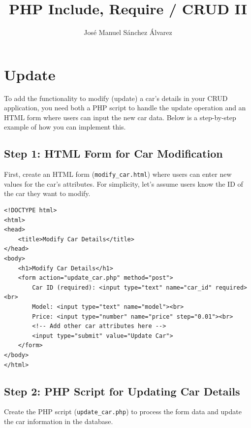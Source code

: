 \documentclass[11pt]{article}
\author{José Manuel Sánchez Álvarez}
\date{}
\title{PHP Include, Require / CRUD II}
\begin{document}
\maketitle
\setcounter{tocdepth}{3}
\tableofcontents

\setlength\parindent{10pt}

\section{Update}
\label{sec:orga0c6cbd}
To add the functionality to modify (update) a car's details in your CRUD
application, you need both a PHP script to handle the update operation
and an HTML form where users can input the new car data. Below is a
step-by-step example of how you can implement this.

\subsection{Step 1: HTML Form for Car Modification}
\label{sec:orgaf7036d}
First, create an HTML form (\texttt{modify\_car.html}) where users can enter new
values for the car's attributes. For simplicity, let's assume users know
the ID of the car they want to modify.

\begin{verbatim}
<!DOCTYPE html>
<html>
<head>
    <title>Modify Car Details</title>
</head>
<body>
    <h1>Modify Car Details</h1>
    <form action="update_car.php" method="post">
        Car ID (required): <input type="text" name="car_id" required><br>
        Model: <input type="text" name="model"><br>
        Price: <input type="number" name="price" step="0.01"><br>
        <!-- Add other car attributes here -->
        <input type="submit" value="Update Car">
    </form>
</body>
</html>
\end{verbatim}

\subsection{Step 2: PHP Script for Updating Car Details}
\label{sec:org802b95b}
Create the PHP script (\texttt{update\_car.php}) to process the form data and
update the car information in the database.
\end{document}
